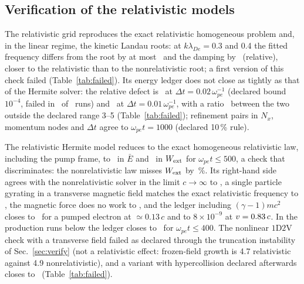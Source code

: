 \documentclass[aps,pre,reprint,floatfix,amsmath,amssymb,nofootinbib,superscriptaddress]{revtex4-2}
\newcommand{\wpe}{\omega_{pe}}
\newcommand{\Wext}{W_{\rm ext}}
\begin{document}
\subsection{Verification of the relativistic models}
The relativistic grid reproduces the exact relativistic homogeneous problem and, in the linear regime, the kinetic Landau roots: at $k\lambda_{De}=0.3$ and 0.4 the fitted frequency differs from the root by at most \rgCerrW\ and the damping by \rgCerrG\ (relative), closer to the relativistic than to the nonrelativistic root; a first version of this check failed (Table~\ref{tab:failed}). Its energy ledger does not close as tightly as that of the Hermite solver: the relative defect is \rgDled\ at $\Delta t=0.02\,\wpe^{-1}$ (declared bound $10^{-4}$, failed in \rgDfail\ of \rgDtot\ runs) and \rgDledOne\ at $\Delta t=0.01\,\wpe^{-1}$, with a ratio \rgDratio\ between the two outside the declared range 3--5 (Table~\ref{tab:failed}); refinement pairs in $N_x$, momentum nodes and $\Delta t$ agree to $\wpe t=1000$ (declared 10\,\% rule).

The relativistic Hermite model reduces to the exact homogeneous relativistic law, including the pump frame, to \gOneE\ in $\bar E$ and \gOneW\ in $\Wext$ for $\wpe t\le500$, a check that discriminates: the nonrelativistic law misses $\Wext$ by \gOneNR\,\%. Its right-hand side agrees with the nonrelativistic solver in the limit $c\to\infty$ to \hfOne, a single particle gyrating in a transverse magnetic field matches the exact relativistic frequency to \hfTwo, the magnetic force does no work to \hfThree, and the ledger including $(\gamma-1)mc^2$ closes to \hdLed\ for a pumped electron at $\simeq0.13\,c$ and to $8\times10^{-9}$ at $v=0.83\,c$. In the production runs below the ledger closes to \herLed\ for $\wpe t\le400$. The nonlinear $1\mathrm{D}2\mathrm{V}$ check with a transverse field failed as declared through the truncation instability of Sec.~\ref{sec:verify} (not a relativistic effect: frozen-field growth is 4.7 relativistic against 4.9 nonrelativistic), and a variant with hypercollision declared afterwards closes to \hfBled\ (Table~\ref{tab:failed}).
\end{document}
